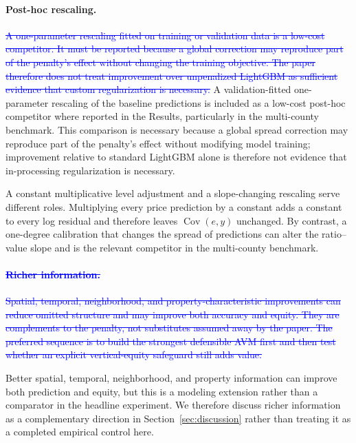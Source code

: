 \documentclass[10pt]{article}
\theoremstyle{definition}
\newcommand{\1}{\mathbf{1}}
\begin{document}
{{\paragraph{Post-hoc rescaling.}
\textcolor{blue}{\sout{A one-parameter rescaling fitted on training or validation data is a low-cost competitor. It must be reported because a global correction may reproduce part of the penalty's effect without changing the training objective. The paper therefore does not treat improvement over unpenalized LightGBM as sufficient evidence that custom regularization is necessary.}}
\textcolor{impGreen}{A validation-fitted one-parameter rescaling of the baseline predictions is included as a low-cost post-hoc competitor where reported in the Results, particularly in the multi-county benchmark. This comparison is necessary because a global spread correction may reproduce part of the penalty's effect without modifying model training; improvement relative to standard LightGBM alone is therefore not evidence that in-processing regularization is necessary.}

A constant multiplicative level adjustment and a slope-changing rescaling serve different roles. Multiplying every price prediction by a constant adds a constant to every log residual and therefore leaves $\operatorname{Cov}(e,y)$ unchanged. By contrast, a one-degree calibration that changes the spread of predictions can alter the ratio--value slope and is the relevant competitor in the multi-county benchmark.

\textcolor{impGreen}{}

\paragraph{\textcolor{blue}{\sout{Richer information.}}}
\textcolor{blue}{\sout{Spatial, temporal, neighborhood, and property-characteristic improvements can reduce omitted structure and may improve both accuracy and equity. They are complements to the penalty, not substitutes assumed away by the paper. The preferred sequence is to build the strongest defensible AVM first and then test whether an explicit vertical-equity safeguard still adds value.}}

\textcolor{impGreen}{Better spatial, temporal, neighborhood, and property information can improve both prediction and equity, but this is a modeling extension rather than a comparator in the headline experiment. We therefore discuss richer information as a complementary direction in Section~\ref{sec:discussion} rather than treating it as a completed empirical control here.}


}}
\end{document}
